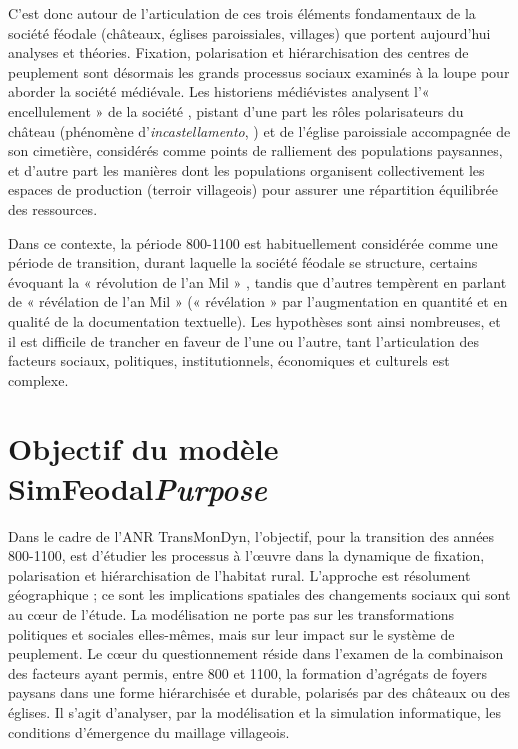 {	C'est donc autour de l'articulation de ces trois éléments fondamentaux de la société féodale (châteaux, églises paroissiales, villages) que portent aujourd'hui analyses et théories.
	Fixation, polarisation et hiérarchisation des centres de peuplement sont désormais les grands processus sociaux examinés à la loupe pour aborder la société médiévale.
	Les historiens médiévistes analysent l'« encellulement » de la société \autocite{fossier_enfance_1982}, pistant d'une part les rôles polarisateurs du château (phénomène d'\textit{incastellamento},  \cite{toubert_les_1973}) et de l'église paroissiale accompagnée de son cimetière, considérés comme points de ralliement des populations paysannes, et d'autre part les manières dont les populations organisent collectivement les espaces de production (terroir villageois) pour assurer une répartition équilibrée des ressources.
	
	Dans ce contexte, la période 800-1100 est habituellement considérée comme une période de transition, durant laquelle la société féodale se structure, certains évoquant la « révolution de l'an Mil » \autocite{fossier_enfance_1982}, tandis que d'autres tempèrent en parlant de « révélation de l'an Mil » \autocite{barthelemy_societe_1993} (« révélation » par l'augmentation en quantité et en qualité de la documentation textuelle).
	Les hypothèses sont ainsi nombreuses, et il est difficile de trancher en faveur de l'une ou l'autre, tant l'articulation des facteurs sociaux, politiques, institutionnels, économiques et culturels est complexe.
}

\section[Objectif du modèle SimFeodal --  \textit{Purpose}]{Objectif du modèle SimFeodal\protect\newline \large{\textit{Purpose}}}

{\redroman
	Dans le cadre de l'ANR TransMonDyn, l'objectif, pour la transition des années 800-1100, est d'étudier les processus à l'œuvre dans la dynamique de fixation, polarisation et hiérarchisation de l'habitat rural.
	L'approche est résolument géographique ; ce sont les implications spatiales des changements sociaux qui sont au cœur de l'étude.
	La modélisation ne porte pas sur les transformations politiques et sociales elles-mêmes, mais sur leur impact sur le système de peuplement.
	Le cœur du questionnement réside dans l'examen de la combinaison des facteurs ayant permis, entre 800 et 1100, la formation d'agrégats de foyers paysans dans une forme hiérarchisée et durable, polarisés par des châteaux ou des églises.
	Il s'agit d'analyser, par la modélisation et la simulation informatique, les conditions d'émergence du maillage villageois.
}





